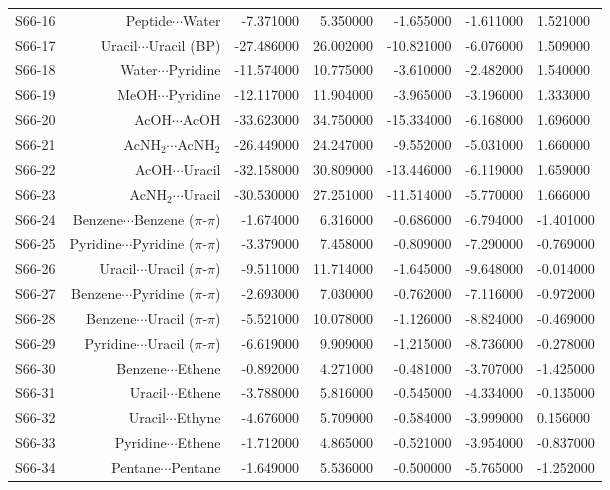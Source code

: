 \begin{table}
\begin{adjustbox}{center}
\begin{tabular}{lrrrrr}
S66-16 & Peptide$\cdots$Water & -7.371000 & 5.350000 & -1.655000 & -1.611000 & 1.521000 \\
S66-17 & Uracil$\cdots$Uracil (BP) & -27.486000 & 26.002000 & -10.821000 & -6.076000 & 1.509000 \\
S66-18 & Water$\cdots$Pyridine & -11.574000 & 10.775000 & -3.610000 & -2.482000 & 1.540000 \\
S66-19 & MeOH$\cdots$Pyridine & -12.117000 & 11.904000 & -3.965000 & -3.196000 & 1.333000 \\
S66-20 & AcOH$\cdots$AcOH & -33.623000 & 34.750000 & -15.334000 & -6.168000 & 1.696000 \\
S66-21 & AcNH$_2$$\cdots$AcNH$_2$ & -26.449000 & 24.247000 & -9.552000 & -5.031000 & 1.660000 \\
S66-22 & AcOH$\cdots$Uracil & -32.158000 & 30.809000 & -13.446000 & -6.119000 & 1.659000 \\
S66-23 & AcNH$_2$$\cdots$Uracil & -30.530000 & 27.251000 & -11.514000 & -5.770000 & 1.666000 \\
S66-24 & Benzene$\cdots$Benzene ($\pi$-$\pi$) & -1.674000 & 6.316000 & -0.686000 & -6.794000 & -1.401000 \\
S66-25 & Pyridine$\cdots$Pyridine ($\pi$-$\pi$) & -3.379000 & 7.458000 & -0.809000 & -7.290000 & -0.769000 \\
S66-26 & Uracil$\cdots$Uracil ($\pi$-$\pi$) & -9.511000 & 11.714000 & -1.645000 & -9.648000 & -0.014000 \\
S66-27 & Benzene$\cdots$Pyridine ($\pi$-$\pi$) & -2.693000 & 7.030000 & -0.762000 & -7.116000 & -0.972000 \\
S66-28 & Benzene$\cdots$Uracil ($\pi$-$\pi$) & -5.521000 & 10.078000 & -1.126000 & -8.824000 & -0.469000 \\
S66-29 & Pyridine$\cdots$Uracil ($\pi$-$\pi$) & -6.619000 & 9.909000 & -1.215000 & -8.736000 & -0.278000 \\
S66-30 & Benzene$\cdots$Ethene & -0.892000 & 4.271000 & -0.481000 & -3.707000 & -1.425000 \\
S66-31 & Uracil$\cdots$Ethene & -3.788000 & 5.816000 & -0.545000 & -4.334000 & -0.135000 \\
S66-32 & Uracil$\cdots$Ethyne & -4.676000 & 5.709000 & -0.584000 & -3.999000 & 0.156000 \\
S66-33 & Pyridine$\cdots$Ethene & -1.712000 & 4.865000 & -0.521000 & -3.954000 & -0.837000 \\
S66-34 & Pentane$\cdots$Pentane & -1.649000 & 5.536000 & -0.500000 & -5.765000 & -1.252000 \\

\end{tabular}
\end{adjustbox}
\end{table}
